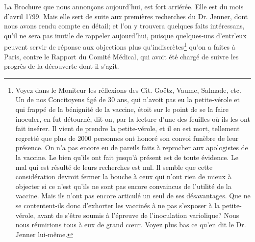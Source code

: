 La Brochure que nous annonçons aujourd'hui, est fort arriérée. Elle est du mois d'avril 1799. Mais elle sert de suite aux premières recherches du Dr. Jenner, dont nous avons rendu compte en détail; et l'on y trouvera quelques faits intéressans, qu'il ne sera pas inutile de rappeler aujourd'hui, puisque quelques-uns d'entr'eux peuvent servir de\setcounter{page}{265} réponse aux objections plus qu'indiscrètes\footnote{Voyez dans le Moniteur les réflexions des Cit. Goëtz, Vaume, Salmade, etc. Un de nos Concitoyens âgé de 30 ans, qui n'avoit pas eu la petite-vérole et qui frappé de la bénignité de la vaccine, étoit sur le point de se la faire inoculer, en fut détourné, dit-on, par la lecture d'une des feuilles où ils les ont fait insérer. Il vient de prendre la petite-vérole, et il en est mort, tellement regretté que plus de 2000 personnes ont honoré son convoi funèbre de leur présence. On n'a pas encore eu de pareils faits à reprocher aux apologistes de la vaccine. Le bien qu'ils ont fait jusqu'à présent est de toute évidence. Le mal qui est résulté de leurs recherches est nul. Il semble que cette considération devroit fermer la bouche à ceux qui n'ont rien de mieux à objecter si ce n'est qu'ils ne sont pas encore convaincus de l'utilité de la vaccine. Mais ils n'ont pas encore articulé un seul de ses désavantages. Que ne se contentent-ils donc d'exhorter les vaccinés à ne pas s'exposer à la petite-vérole, avant de s'être soumis à l'épreuve de l'inoculation variolique? Nous nous réunirions tous à eux de grand cœur. Voyez plus bas ce qu'en dit le Dr. Jenner lui-même.} qu'on a faites à Paris, contre le Rapport du Comité Médical, qui avoit été chargé de suivre les progrès de la découverte dont il s'agit.
